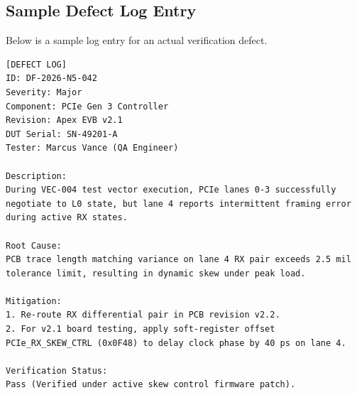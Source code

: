 \subsection{Sample Defect Log Entry}
Below is a sample log entry for an actual verification defect.

\begin{lstlisting}[caption={Defect report log entry (DF-2026-N5-042).}]
[DEFECT LOG]
ID: DF-2026-N5-042
Severity: Major
Component: PCIe Gen 3 Controller
Revision: Apex EVB v2.1
DUT Serial: SN-49201-A
Tester: Marcus Vance (QA Engineer)

Description:
During VEC-004 test vector execution, PCIe lanes 0-3 successfully negotiate to L0 state, but lane 4 reports intermittent framing error during active RX states. 

Root Cause:
PCB trace length matching variance on lane 4 RX pair exceeds 2.5 mil tolerance limit, resulting in dynamic skew under peak load.

Mitigation:
1. Re-route RX differential pair in PCB revision v2.2.
2. For v2.1 board testing, apply soft-register offset PCIe_RX_SKEW_CTRL (0x0F48) to delay clock phase by 40 ps on lane 4.

Verification Status:
Pass (Verified under active skew control firmware patch).
\end{lstlisting}
